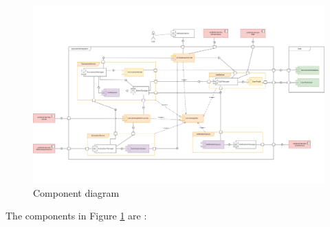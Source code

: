 \begin{figure}[H]
    \centering
    \vspace{-3cm}
    \includegraphics[width=1.6\textwidth,angle=90,origin=c]{Diagrams/component_diagram.png}
    \caption{Component diagram}
    \label{component_diagram}
\end{figure}
The components in Figure \ref{component_diagram} are :

